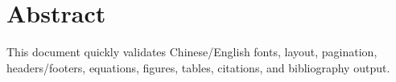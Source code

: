 \chapter*{Abstract}
This document quickly validates Chinese/English fonts, layout, pagination, headers/footers, equations, figures, tables, citations, and bibliography output.

